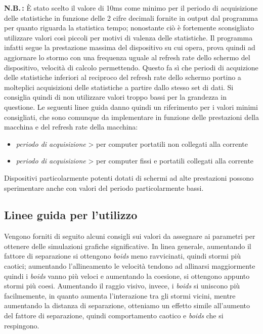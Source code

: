 \documentclass{article}
\begin{document}
\textbf{N.B.\,:} È stato scelto il valore di 10ms come minimo per il periodo di 
acquisizione delle statistiche in funzione delle 2 cifre decimali fornite in 
output dal programma per quanto riguarda la statistica tempo; nonostante ciò è 
fortemente sconsigliato utilizzare valori così piccoli per motivi di valenza 
delle statistiche. Il programma infatti segue la prestazione massima del 
dispositivo su cui opera, prova quindi ad aggiornare lo stormo con una frequenza
 uguale al refresh rate dello schermo del dispositivo, velocità di calcolo 
 permettendo. Questo fa sì che periodi di acquizione delle statistiche inferiori
  al reciproco del refresh rate dello schermo portino a molteplici acquisizioni 
  delle statistiche a partire dallo stesso set di dati. Si consiglia quindi di 
  non utilizzare valori troppo bassi per la grandezza in questione. Le seguenti 
  linee guida danno quindi un riferimento per i valori minimi consigliati, che 
  sono comunque da implementare in funzione delle prestazioni della macchina e 
  del refresh rate della macchina:
\begin{itemize}
    \item \:\textit{periodo di acquisizione} \textgreater{} per computer 
    portatili non collegati alla corrente
    \item \:\textit{periodo di acquisizione} \textgreater{} per computer fissi
     e portatili collegati alla corrente
\end{itemize} 
Dispositivi particolarmente potenti dotati di schermi ad alte prestazioni 
possono sperimentare anche con valori del periodo particolarmente bassi.

\subsection{Linee guida per l'utilizzo}
Vengono forniti di seguito alcuni consigli sui valori da assegnare ai parametri 
per ottenere delle simulazioni grafiche significative. In linea generale, 
aumentando il fattore di separazione si ottengono \textit{boids} meno 
ravvicinati, quindi stormi più caotici; aumentando l'allineamento le velocità 
tendono ad allinarsi maggiormente quindi i \textit{boids} vanno più veloci e 
aumentando la coesione, si ottengono appunto stormi più coesi. Aumentando il 
raggio visivo, invece, i \textit{boids} si uniscono più facilmemente, in quanto 
aumenta l'interazione tra gli stormi vicini, mentre aumentando la distanza di 
separazione, otteniamo un effetto simile all'aumento del fattore di separazione,
 quindi comportamento caotico e \textit{boids} che si respingono.
\end{document}
